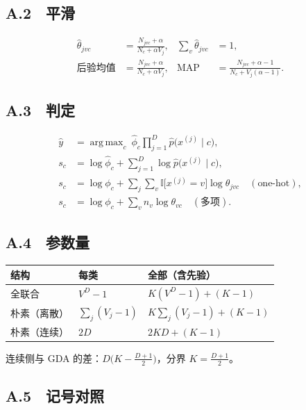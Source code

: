 \documentclass[11pt,a4paper,fontset=windows,zihao=-4]{ctexart}
\DeclareMathOperator*{\argmax}{arg\,max}
\newcommand{\tabhead}{\sffamily\bfseries\color{navy}}
\begin{document}
\subsection*{A.2　平滑}

\begin{align}
  \hat\theta_{jvc}&=\frac{N_{jvc}+\alpha}{N_c+\alpha V_j},&
  \sum_v\hat\theta_{jvc}&=1,\\
  \text{后验均值}&=\frac{N_{jvc}+\alpha}{N_c+\alpha V_j},&
  \text{MAP}&=\frac{N_{jvc}+\alpha-1}{N_c+V_j(\alpha-1)} .
\end{align}

\subsection*{A.3　判定}

\begin{align}
  \hat y&=\argmax_c\ \hat\phi_c\prod_{j=1}^{D}\hat p\bigl(x^{(j)}\mid c\bigr),\\
  s_c&=\log\hat\phi_c+\sum_{j=1}^{D}\log\hat p\bigl(x^{(j)}\mid c\bigr),\\
  s_c&=\log\phi_c+\sum_{j}\sum_{v}\mathbb{I}\bigl[x^{(j)}=v\bigr]\log\theta_{jvc}
  \quad(\text{one-hot}),\\
  s_c&=\log\phi_c+\sum_{v}n_v\log\theta_{vc}\quad(\text{多项}).
\end{align}

\subsection*{A.4　参数量}

\begin{center}
\small
\begin{tabular}{@{}lll@{}}
\toprule
\rowcolor{navy!7}
\tabhead 结构 & \tabhead 每类 & \tabhead 全部（含先验）\\
\midrule
全联合 & $V^D-1$ & $K(V^D-1)+(K-1)$\\
朴素（离散） & $\sum_j(V_j-1)$ & $K\sum_j(V_j-1)+(K-1)$\\
朴素（连续） & $2D$ & $2KD+(K-1)$\\
\bottomrule
\end{tabular}
\end{center}

连续侧与 GDA 的差：$D\bigl(K-\frac{D+1}2\bigr)$，分界 $K=\frac{D+1}2$。

\subsection*{A.5　记号对照}
\end{document}
